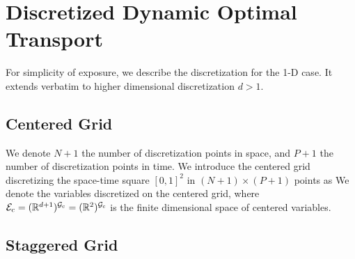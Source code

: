 
\section{Discretized Dynamic Optimal Transport}

For simplicity of exposure, we describe the discretization for the 1-D case. It extends verbatim to higher dimensional discretization $d>1$.

\subsection{Centered Grid}

We denote $N+1$ the number of discretization points in space, and $P+1$ the number of discretization points in time. We introduce the centered grid discretizing the space-time square $[0,1]^2$ in $(N+1)\times(P+1)$ points as
We denote 
the variables discretized on the centered grid, where $\mathcal{E}_{\text{c}} = (\mathbb{R}^{d+1})^{\mathcal{G}_{\text{c}}}= (\mathbb{R}^{2})^{\mathcal{G}_{\text{c}}}$ 
is the finite dimensional space of centered variables. 

\subsection{Staggered Grid}

